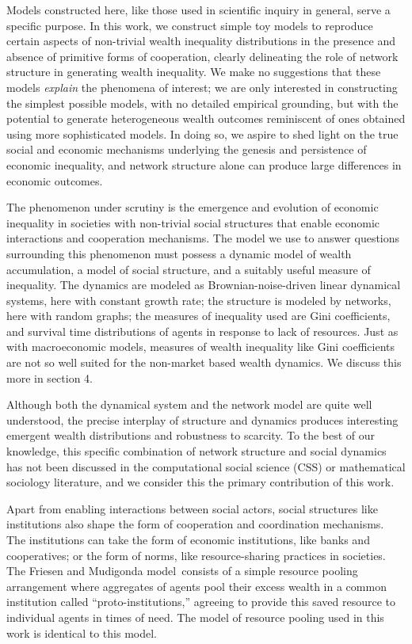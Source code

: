 Models constructed here, like those used in scientific inquiry in general, serve a specific purpose. In this work, we construct simple toy models to reproduce certain aspects of non-trivial wealth inequality distributions in the presence and absence of primitive forms of cooperation, clearly delineating the role of network structure in generating wealth inequality. We make no suggestions that these models \textit{explain} the phenomena of interest; we are only interested in constructing the simplest possible models, with no detailed empirical grounding, but with the potential to generate heterogeneous wealth outcomes reminiscent of ones obtained using more sophisticated models. In doing so, we aspire to shed light on the true social and economic mechanisms underlying the genesis and persistence of economic inequality, and network structure alone can produce large differences in economic outcomes. 


\label{giniKindaSucks}
The phenomenon under scrutiny is the emergence and evolution of economic inequality in societies with non-trivial social structures that enable economic interactions and cooperation mechanisms. The model we use to answer questions surrounding this phenomenon must possess a dynamic model of wealth accumulation, a model of social structure, and a suitably useful measure of inequality. The dynamics are modeled as Brownian-noise-driven linear dynamical systems, here with constant growth rate; the structure is modeled by networks, here with random graphs; the measures of inequality used are Gini coefficients, and survival time distributions of agents in response to lack of resources. Just as with macroeconomic models, measures of wealth inequality like Gini coefficients are not so well suited for the non-market based wealth dynamics. We discuss this more in section 4. 


Although both the dynamical system and the network model are quite well understood, the precise interplay of structure and dynamics produces interesting emergent wealth distributions and robustness to scarcity. To the best of our knowledge, this specific combination of network structure and social dynamics has not been discussed in the computational social science (CSS) or mathematical sociology literature, and we consider this the primary contribution of this work. 

Apart from enabling interactions between social actors, social structures like institutions also shape the form of cooperation and coordination mechanisms. The institutions can take the form of economic institutions, like banks and cooperatives; or the form of norms, like resource-sharing practices in societies. The Friesen and Mudigonda model~\cite{srimil}consists of a simple resource pooling arrangement where aggregates of agents pool their excess wealth in a common institution called ``proto-institutions,'' agreeing to provide this saved resource to individual agents in times of need. The model of resource pooling used in this work is identical to this model. 

